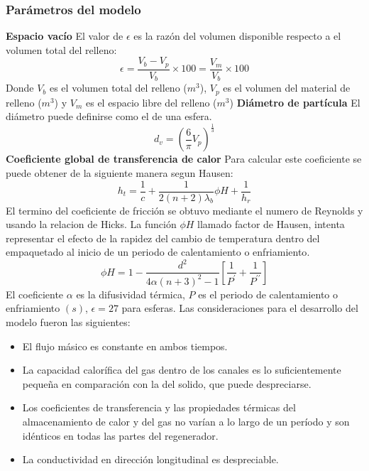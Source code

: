 \documentclass[12pt,letterpaper,final]{article}%
\begin{document}
\subsubsection*{Parámetros del modelo}
\textbf{Espacio vacío}
\newline
El valor de $\epsilon$ es la razón del volumen disponible respecto a el volumen total del relleno:
\begin{equation}
	\epsilon = \frac{V_b -V_p}{V_b} \times 100 = \frac{V_m}{V_b} \times 100
\end{equation}
Donde $V_b$ es el volumen total del relleno ($m^3$), $V_p$ es el volumen del material de relleno ($m^3$) y $V_m$ es el espacio libre del relleno ($m^3$)
\newline
\textbf{Diámetro de partícula}
\newline
El diámetro puede definirse como el de una esfera.
\begin{equation}
	d_v=(\frac{6}{\pi}V_p)^{\frac{1}{3}}
\end{equation}
\textbf{Coeficiente global de transferencia de calor}
\newline
Para calcular este coeficiente se puede obtener de la siguiente manera segun Hausen\cite{Hausen1976}:
\begin{equation}
	h_t= \frac{1}{c} + \frac{1}{2(n+2)\lambda_b}\phi H + \frac{1}{h_r}
\end{equation}
El termino del coeficiente de fricción se obtuvo mediante el numero de Reynolds y usando la relacion de Hicks\cite{Hicks1970}.
\newline
La función $\phi H$ llamado factor de Hausen, intenta representar el efecto de la rapidez del cambio de temperatura dentro del empaquetado al inicio de un periodo de calentamiento o enfriamiento\cite{HINCHCLIFFE1981}.
\begin{equation}
	\phi H = 1 - \frac{d^2}{4 \alpha (n + 3)^2 - 1}  [\frac{1}{P^\prime} + \frac{1}{P^{\prime\prime}}]
\end{equation}
El coeficiente $\alpha$ es la difusividad térmica, $P$ es el periodo de calentamiento o enfriamiento $(s)$, $\epsilon =27$ para esferas.
\newline
Las consideraciones para el desarrollo del modelo fueron las siguientes:
\begin{itemize}
	\item El flujo másico es constante en ambos tiempos.
	\item La capacidad calorífica del gas dentro de los canales es lo suficientemente pequeña en comparación con la del solido, que puede despreciarse.
	\item Los coeficientes de transferencia y las propiedades térmicas del almacenamiento de calor y del gas no varían a lo largo de un período y son idénticos en todas las partes del regenerador.
	\item La conductividad en dirección longitudinal es despreciable. 
\end{itemize}
\end{document}
